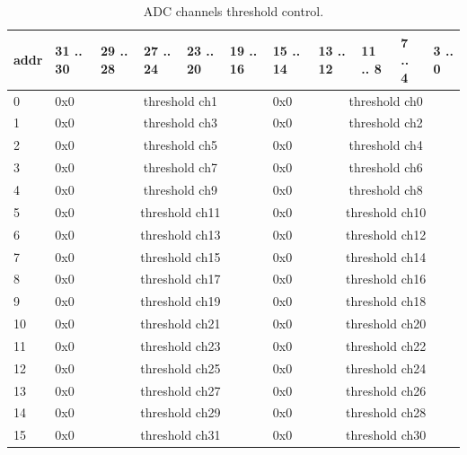 \documentclass{article}
\begin{document}
\begin{table}[H]
\centering
\begin{tabular}{| l | l | l | l | l | l | l | l | l | l | l |}
\hline
addr & 31 .. 30 & 29 .. 28 & 27 .. 24 & 23 .. 20 & 19 .. 16 & 15 .. 14 & 13 .. 12 & 11 .. 8 & 7 .. 4 & 3 .. 0 \\ \hline
0 & 0x0 & \multicolumn{4}{c|}{threshold ch1} & 0x0 & \multicolumn{4}{c|}{threshold ch0} \\ \hline
1 & 0x0 & \multicolumn{4}{c|}{threshold ch3} & 0x0 & \multicolumn{4}{c|}{threshold ch2} \\ \hline
2 & 0x0 & \multicolumn{4}{c|}{threshold ch5} & 0x0 & \multicolumn{4}{c|}{threshold ch4} \\ \hline
3 & 0x0 & \multicolumn{4}{c|}{threshold ch7} & 0x0 & \multicolumn{4}{c|}{threshold ch6} \\ \hline
4 & 0x0 & \multicolumn{4}{c|}{threshold ch9} & 0x0 & \multicolumn{4}{c|}{threshold ch8} \\ \hline
5 & 0x0 & \multicolumn{4}{c|}{threshold ch11} & 0x0 & \multicolumn{4}{c|}{threshold ch10} \\ \hline
6 & 0x0 & \multicolumn{4}{c|}{threshold ch13} & 0x0 & \multicolumn{4}{c|}{threshold ch12} \\ \hline
7 & 0x0 & \multicolumn{4}{c|}{threshold ch15} & 0x0 & \multicolumn{4}{c|}{threshold ch14} \\ \hline
8 & 0x0 & \multicolumn{4}{c|}{threshold ch17} & 0x0 & \multicolumn{4}{c|}{threshold ch16} \\ \hline
9 & 0x0 & \multicolumn{4}{c|}{threshold ch19} & 0x0 & \multicolumn{4}{c|}{threshold ch18} \\ \hline
10 & 0x0 & \multicolumn{4}{c|}{threshold ch21} & 0x0 & \multicolumn{4}{c|}{threshold ch20} \\ \hline
11 & 0x0 & \multicolumn{4}{c|}{threshold ch23} & 0x0 & \multicolumn{4}{c|}{threshold ch22} \\ \hline
12 & 0x0 & \multicolumn{4}{c|}{threshold ch25} & 0x0 & \multicolumn{4}{c|}{threshold ch24} \\ \hline
13 & 0x0 & \multicolumn{4}{c|}{threshold ch27} & 0x0 & \multicolumn{4}{c|}{threshold ch26} \\ \hline
14 & 0x0 & \multicolumn{4}{c|}{threshold ch29} & 0x0 & \multicolumn{4}{c|}{threshold ch28} \\ \hline
15 & 0x0 & \multicolumn{4}{c|}{threshold ch31} & 0x0 & \multicolumn{4}{c|}{threshold ch30} \\ \hline
\end{tabular}
\caption{ADC channels threshold control.\label{tab4}}
\end{table}
\end{document}
